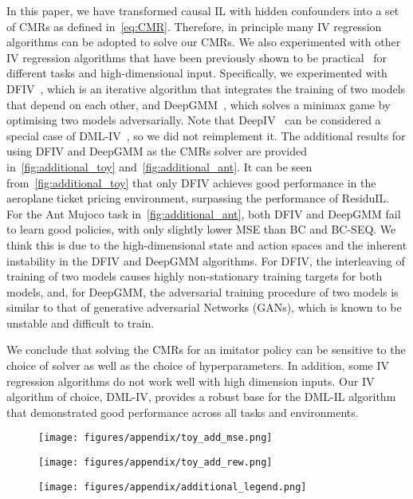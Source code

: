 In this paper, we have transformed causal IL with hidden confounders into a set of CMRs as defined in~\cref{eq:CMR}. Therefore, in principle many IV regression algorithms can be adopted to solve our CMRs. We also experimented with other IV regression algorithms that have been previously shown to be practical~\citep{Shao2024} for different tasks and high-dimensional input. Specifically, we experimented with DFIV~\citep{Xu2020}, which is an iterative algorithm that integrates the training of two models that depend on each other, and DeepGMM~\citep{Bennett2019DeepAnalysis}, which solves a minimax game by optimising two models adversarially. Note that DeepIV~\citep{Hartford2017DeepPrediction} can be considered a special case of DML-IV~\citep{Shao2024}, so we did not reimplement it. The additional results for using DFIV and DeepGMM as the CMRs solver are provided in~\cref{fig:additional_toy} and~\cref{fig:additional_ant}. It can be seen from~\cref{fig:additional_toy} that only DFIV achieves good performance in the aeroplane ticket pricing environment, surpassing the performance of ResiduIL. For the Ant Mujoco task in~\cref{fig:additional_ant}, both DFIV and DeepGMM fail to learn good policies, with only slightly lower MSE than BC and BC-SEQ. We think this is due to the high-dimensional state and action spaces and the inherent instability in the DFIV and DeepGMM algorithms. For DFIV, the interleaving of training of two models causes highly non-stationary training targets for both models, and, for DeepGMM, the adversarial training procedure of two models is similar to that of generative adversarial Networks (GANs), which is known to be unstable and difficult to train.

We conclude that solving the CMRs for an imitator policy can be sensitive to the choice of solver as well as the choice of hyperparameters. In addition, some IV regression algorithms do not work well with high dimension inputs. Our IV algorithm of choice, DML-IV, provides a robust base for the DML-IL algorithm that demonstrated good performance across all tasks and environments.


\begin{figure*}[t]
\begin{subfigure}[c]{0.4\textwidth}
\centering\texttt{[image: figures/appendix/toy\_add\_mse.png]}
\end{subfigure}
\centering
\begin{subfigure}[c]{0.4\textwidth}
\centering
\texttt{[image: figures/appendix/toy\_add\_rew.png]}
\end{subfigure}
\begin{subfigure}[c]{0.1\textwidth}
\centering
\texttt{[image: figures/appendix/additional\_legend.png]}
\end{subfigure}
\vspace{-8pt}
\caption{Additional results for the MSE between learnt policy and expert, and the average reward, in the plane ticket environment (Example~\ref{eg:plane}), with DFIV and DeepGMM as the CMRs solver.}
\label{fig:additional_toy}
\end{figure*}

